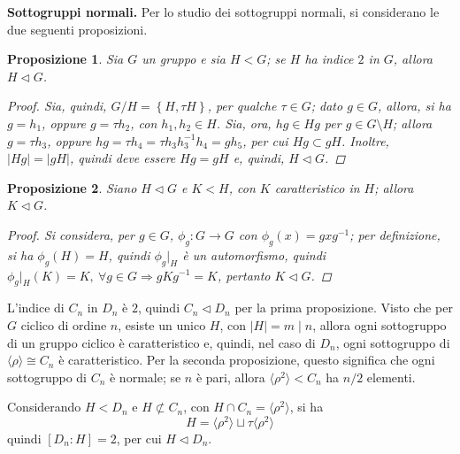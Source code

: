 \documentclass[11pt]{scrartcl}
\theoremstyle{style1}
\newtheorem{prop}{Proposizione}[section]
\numberwithin{equation}{subsection}
\renewcommand{\textbf}[1]{\textsf{\bfseries #1}}
\begin{document}
\textbf{Sottogruppi normali.} Per lo studio dei sottogruppi normali, si considerano le due seguenti proposizioni.
\begin{prop}
	Sia $G$ un gruppo e sia $H < G$; se $H$ ha indice $2$ in $G$, allora $H \lhd G$. 
	\begin{proof}
		Sia, quindi, $G / H = \left\{ H , \tau  H\right\} $, per qualche $\tau  \in G$; dato $g \in G$, allora, si ha $g = h_1$, oppure $g = \tau h_2$, con $h_1,h_2 \in H$. 
		Sia, ora, $hg \in Hg$ per $g \in G \setminus H$; allora $g = \tau  h_3$, oppure $hg = \tau h_4 = \tau h_3h_3^{-1}h_4= gh_5$, per cui $Hg \subset gH$. 
		Inoltre, $\lvert Hg \rvert =\lvert gH \rvert $, quindi deve essere $Hg = gH$ e, quindi, $H\lhd G$.
	\end{proof}
\end{prop}
\begin{prop}
	Siano $H \lhd G$ e $K < H$, con $K$ caratteristico in $H$; allora $K \lhd G$.
	\begin{proof}
		Si considera, per $g \in G$, $\phi _g : G\to G$ con $\phi_g(x) = gxg^{-1}$; per definizione, si ha $\phi _g (H) = H$, quindi $\phi_g|_{H} $ \`e un automorfismo, quindi $\phi _g|_{H} (K) = K, \ \forall g \in G \Rightarrow gKg^{-1} = K$, pertanto $K \lhd G$.
	\end{proof}
\end{prop} 

\noindent L'indice di $C_n$ in $D_n$ \`e $2$, quindi $C_n \lhd D_n$ per la prima proposizione.
Visto che per $G$ ciclico di ordine $n$, esiste un unico $H $, con $\lvert H \rvert =m  \mid n$, allora ogni sottogruppo di un gruppo ciclico \`e caratteristico e, quindi, nel caso di $D_n$, ogni sottogruppo di $\langle \rho  \rangle\cong C_n$ \`e caratteristico.
Per la seconda proposizione, questo significa che ogni sottogruppo di $C_n$ \`e normale; se $n$ \`e pari, allora $\langle \rho ^2  \rangle<C_n$ ha $n / 2$ elementi.

Considerando $H < D_n$ e $H \not \subset C_n$, con $H\cap C_n = \langle \rho ^2 \rangle$, si ha
\[
H=\langle \rho ^2 \rangle \sqcup \tau  \langle \rho ^2 \rangle
\] 
quindi $[D_n : H] = 2$, per cui $H \lhd D_n$.
\end{document}
